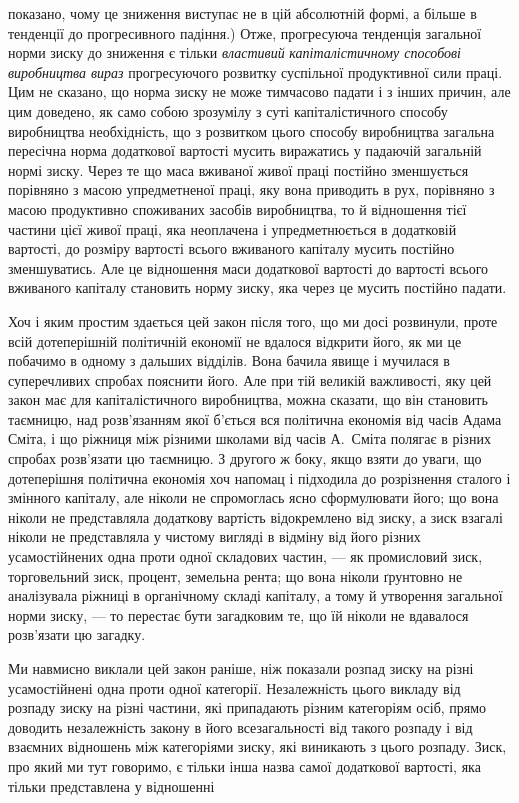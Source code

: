 \parcont{}  %
показано, чому це зниження виступає не в цій абсолютній формі,
а більше в тенденції до прогресивного падіння.) Отже, прогресуюча
тенденція загальної норми зиску до зниження є тільки
\emph{властивий} \emph{капіталістичному способові виробництва вираз}
прогресуючого розвитку суспільної продуктивної сили праці.
Цим не сказано, що норма зиску не може тимчасово падати і
з інших причин, але цим доведено, як само собою зрозумілу
з суті капіталістичного способу виробництва необхідність, що
з розвитком цього способу виробництва загальна пересічна норма
додаткової вартості мусить виражатись у падаючій загальній
нормі зиску. Через те що маса вживаної живої праці постійно
зменшується порівняно з масою упредметненої праці, яку вона
приводить в рух, порівняно з масою продуктивно споживаних
засобів виробництва, то й відношення тієї частини цієї живої
праці, яка неоплачена і упредметнюється в додатковій вартості,
до розміру вартості всього вживаного капіталу мусить постійно
зменшуватись. Але це відношення маси додаткової вартості до
вартості всього вживаного капіталу становить норму зиску, яка
через це мусить постійно падати.

Хоч і яким простим здається цей закон після того, що ми досі
розвинули, проте всій дотеперішній політичній економії не вдалося
відкрити його, як ми це побачимо в одному з дальших відділів.
Вона бачила явище і мучилася в суперечливих спробах
пояснити його. Але при тій великій важливості, яку цей закон
має для капіталістичного виробництва, можна сказати, що він
становить таємницю, над розв’язанням якої б’ється вся політична
економія від часів Адама Сміта, і що ріжниця між різними школами
від часів А.~Сміта полягає в різних спробах розв’язати цю
таємницю. З другого ж боку, якщо взяти до уваги, що дотеперішня
політична економія хоч напомац і підходила до розрізнення
сталого і змінного капіталу, але ніколи не спромоглась
ясно сформулювати його; що вона ніколи не представляла додаткову
вартість відокремлено від зиску, а зиск взагалі ніколи
не представляла у чистому вигляді в відміну від його різних
усамостійнених одна проти одної складових частин, — як промисловий
зиск, торговельний зиск, процент, земельна рента; що
вона ніколи ґрунтовно не аналізувала ріжниці в органічному
складі капіталу, а тому й утворення загальної норми зиску, —
то перестає бути загадковим те, що їй ніколи не вдавалося розв’язати
цю загадку.

Ми навмисно виклали цей закон раніше, ніж показали розпад
зиску на різні усамостійнені одна проти одної категорії. Незалежність
цього викладу від розпаду зиску на різні частини,
які припадають різним категоріям осіб, прямо доводить незалежність
закону в його всезагальності від такого розпаду і від
взаємних відношень між категоріями зиску, які виникають з цього
розпаду. Зиск, про який ми тут говоримо, є тільки інша назва
самої додаткової вартості, яка тільки представлена у відношенні
\parbreak{}  %
